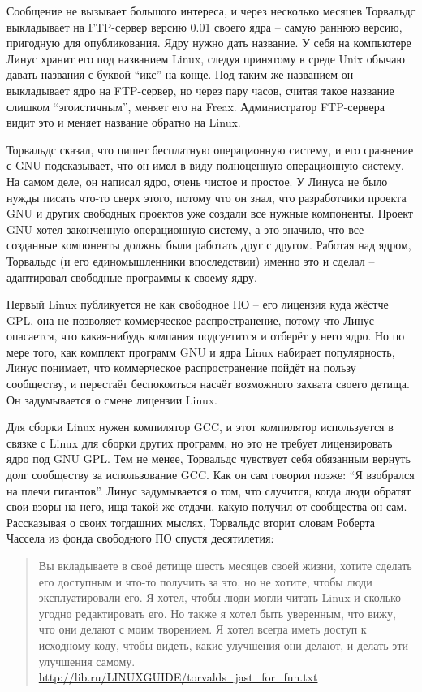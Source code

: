 Сообщение не вызывает большого интереса, и через несколько месяцев Торвальдс выкладывает на FTP-сервер версию 0.01 своего ядра -- самую раннюю версию, пригодную для опубликования. Ядру нужно дать название. У себя на компьютере Линус хранит его под названием Linux, следуя принятому в среде Unix обычаю давать названия с буквой \enquote{икс} на конце. Под таким же названием он выкладывает ядро на FTP-сервер, но через пару часов, считая такое название слишком \enquote{эгоистичным}, меняет его на Freax. Администратор FTP-сервера видит это и меняет название обратно на Linux.

Торвальдс сказал, что пишет бесплатную операционную систему, и его сравнение с GNU подсказывает, что он имел в виду полноценную операционную систему. На самом деле, он написал ядро, очень чистое и простое. У Линуса не было нужды писать что-то сверх этого, потому что он знал, что разработчики проекта GNU и других свободных проектов уже создали все нужные компоненты. Проект GNU хотел законченную операционную систему, а это значило, что все созданные компоненты должны были работать друг с другом. Работая над ядром, Торвальдс (и его единомышленники впоследствии) именно это и сделал -- адаптировал свободные программы к своему ядру.

Первый Linux публикуется не как свободное ПО -- его лицензия куда жёстче GPL, она не позволяет коммерческое распространение, потому что Линус опасается, что какая-нибудь компания подсуетится и отберёт у него ядро. Но по мере того, как комплект программ GNU и ядра Linux набирает популярность, Линус понимает, что коммерческое распространение пойдёт на пользу сообществу, и перестаёт беспокоиться насчёт возможного захвата своего детища. Он задумывается о смене лицензии Linux.

Для сборки Linux нужен компилятор GCC, и этот компилятор используется в связке с Linux для сборки других программ, но это не требует лицензировать ядро под GNU GPL. Тем не менее, Торвальдс чувствует себя обязанным вернуть долг сообществу за использование GCC. Как он сам говорил позже: \enquote{Я взобрался на плечи гигантов}. Линус задумывается о том, что случится, когда люди обратят свои взоры на него, ища такой же отдачи, какую получил от сообщества он сам. Рассказывая о своих тогдашних мыслях, Торвальдс вторит словам Роберта Чассела из фонда свободного ПО спустя десятилетия:

\begin{quote}
Вы вкладываете в своё детище шесть месяцев своей жизни, хотите сделать его доступным и что-то получить за это, но не хотите, чтобы люди эксплуатировали его. Я хотел, чтобы люди могли читать Linux и сколько угодно редактировать его. Но также я хотел быть уверенным, что вижу, что они делают с моим творением. Я хотел всегда иметь доступ к исходному коду, чтобы видеть, какие улучшения они делают, и делать эти улучшения самому. \url{http://lib.ru/LINUXGUIDE/torvalds_jast_for_fun.txt}
\end{quote}

